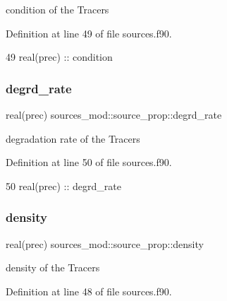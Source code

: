 condition of the Tracers 



Definition at line 49 of file sources.\+f90.


\begin{DoxyCode}
49         \textcolor{keywordtype}{real(prec)} :: condition
\end{DoxyCode}
\mbox{\label{structsources__mod_1_1source__prop_a6c302a7a21c554720641b4f377489794}} 
\subsubsection{\texorpdfstring{degrd\+\_\+rate}{degrd\_rate}}
{\footnotesize\ttfamily real(prec) sources\+\_\+mod\+::source\+\_\+prop\+::degrd\+\_\+rate\hspace{0.3cm}{\ttfamily [private]}}



degradation rate of the Tracers 



Definition at line 50 of file sources.\+f90.


\begin{DoxyCode}
50         \textcolor{keywordtype}{real(prec)} :: degrd\_rate
\end{DoxyCode}
\mbox{\label{structsources__mod_1_1source__prop_ac569c18f02e33c5ca95f423bcb9fb30e}} 
\subsubsection{\texorpdfstring{density}{density}}
{\footnotesize\ttfamily real(prec) sources\+\_\+mod\+::source\+\_\+prop\+::density\hspace{0.3cm}{\ttfamily [private]}}



density of the Tracers 



Definition at line 48 of file sources.\+f90.


